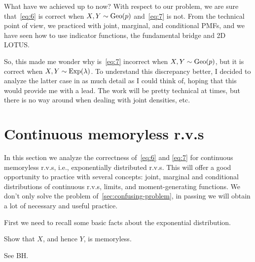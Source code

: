 \documentclass[a4paper,11pt]{article}
\begin{document}
What have we achieved up to now? With respect to our problem, we are sure that~\eqref{eq:6} is correct when $X, Y \sim \mathrm{Geo}(p)$ and~\cref{eq:7} is not.
From the technical point of view, we practiced with joint, marginal, and conditional PMFs, and we have seen how to use indicator functions, the fundamental bridge and 2D LOTUS.

So, this made me wonder why is~\eqref{eq:7} incorrect when $X, Y\sim\mathrm{Geo}(p)$, but it is correct when $X,Y\sim\mathrm{Exp}(\lambda)$.
To understand this discrepancy better, I decided to analyze the latter case in as much detail as I could think of, hoping that this would  provide me with a lead.
The work will be pretty technical at times, but there is no way around when dealing with joint densities, etc.



\section{Continuous memoryless r.v.s}
\label{sec:exerc-expon-distr}

In this section we analyze the correctness of~\cref{eq:6} and \cref{eq:7} for continuous memoryless r.v.s, i.e., exponentially distributed r.v.s.
This will offer a good opportunity to practice with several concepts: joint, marginal and conditional distributions of continuous r.v.s,  limits, and moment-generating functions.
We don't only solve the problem of~\cref{sec:confusing-problem}, in passing we will obtain a lot of necessary and useful practice.

First we need to recall some basic facts about the exponential distribution.

\begin{exercise}
Show that $X$, and hence $Y$, is memoryless.
\begin{solution}
  See BH.
\end{solution}
\end{exercise}
\end{document}
